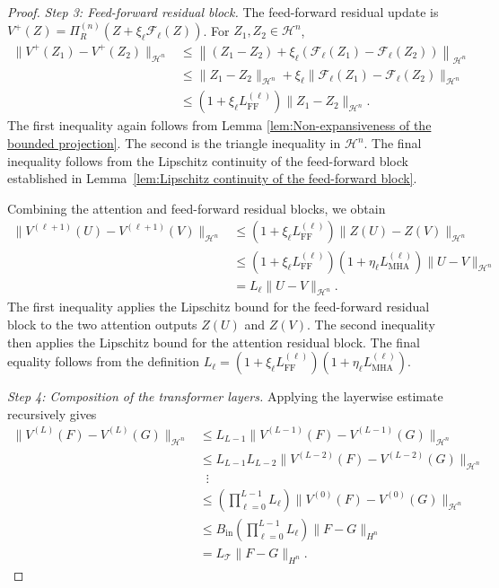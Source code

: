 \begin{proof}
\textit{Step 3: Feed-forward residual block.} The feed-forward residual update is \(V^{+}(Z)=\Pi_R^{(n)}\left(Z+\xi_\ell\mathcal F_\ell(Z)\right)\). For \(Z_1,Z_2\in\mathcal H^n\),
\[
\begin{aligned}
\|V^{+}(Z_1)-V^{+}(Z_2)\|_{\mathcal H^n}
&\leqslant
\left\|
(Z_1-Z_2)
+
\xi_\ell
\left(
\mathcal F_\ell(Z_1)
-
\mathcal F_\ell(Z_2)
\right)
\right\|_{\mathcal H^n}\\
&\leqslant
\|Z_1-Z_2\|_{\mathcal H^n}
+
\xi_\ell
\|\mathcal F_\ell(Z_1)-\mathcal F_\ell(Z_2)\|_{\mathcal H^n}\\
&\leqslant
\left(
1+\xi_\ell L_{\mathrm{FF}}^{(\ell)}
\right)
\|Z_1-Z_2\|_{\mathcal H^n}.
\end{aligned}
\]
The first inequality again follows from Lemma \ref{lem:Non-expansiveness of the bounded projection}. The second is the triangle inequality in \(\mathcal H^n\). The final inequality follows from the Lipschitz continuity of the feed-forward block established in Lemma~\ref{lem:Lipschitz continuity of the feed-forward block}.

Combining the attention and feed-forward residual blocks, we obtain
\[
\begin{aligned}
\|V^{(\ell+1)}(U)-V^{(\ell+1)}(V)\|_{\mathcal H^n}
&\leqslant
\left(
1+\xi_\ell L_{\mathrm{FF}}^{(\ell)}
\right)
\|Z(U)-Z(V)\|_{\mathcal H^n}\\
&\leqslant
\left(
1+\xi_\ell L_{\mathrm{FF}}^{(\ell)}
\right)
\left(
1+\eta_\ell L_{\mathrm{MHA}}^{(\ell)}
\right)
\|U-V\|_{\mathcal H^n}\\
&=
L_\ell\|U-V\|_{\mathcal H^n}.
\end{aligned}
\]
The first inequality applies the Lipschitz bound for the feed-forward residual block to the two attention outputs \(Z(U)\) and \(Z(V)\). The second inequality then applies the Lipschitz bound for the attention residual block. The final equality follows from the definition \(L_\ell=\left(1+\xi_\ell L_{\mathrm{FF}}^{(\ell)}\right)\left(1+\eta_\ell L_{\mathrm{MHA}}^{(\ell)}\right)\).

\textit{Step 4: Composition of the transformer layers.} Applying the layerwise estimate recursively gives
\[
\begin{aligned}
\|V^{(L)}(F)-V^{(L)}(G)\|_{\mathcal H^n}
&\leqslant
L_{L-1}
\|V^{(L-1)}(F)-V^{(L-1)}(G)\|_{\mathcal H^n}\\
&\leqslant
L_{L-1}L_{L-2}
\|V^{(L-2)}(F)-V^{(L-2)}(G)\|_{\mathcal H^n}\\
&\;\;\vdots\\
&\leqslant
\left(
\prod_{\ell=0}^{L-1}L_\ell
\right)
\|V^{(0)}(F)-V^{(0)}(G)\|_{\mathcal H^n}\\
&\leqslant
B_{\mathrm{in}}
\left(
\prod_{\ell=0}^{L-1}L_\ell
\right)
\|F-G\|_{H^n}\\
&=
L_{\mathcal T}\|F-G\|_{H^n}.
\end{aligned}
\]


\end{proof}
